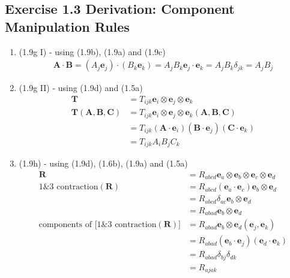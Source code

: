 \documentclass[10pt,a4paper]{book}
\theoremstyle{definition}
\begin{document}
\subsection{Exercise 1.3 Derivation: Component Manipulation Rules}
\begin{enumerate}
\item (1.9g I) - using (1.9b), (1.9a) and (1.9c)
\begin{align}
    \mathbf{A}\cdot\mathbf{B}
    =(A_j\mathbf{e}_j)\cdot(B_k\mathbf{e}_k)
    =A_jB_k\mathbf{e}_j\cdot\mathbf{e}_k
    =A_jB_k\delta_{jk}
    =A_jB_j
\end{align}
\item (1.9g II) - using (1.9d) and (1.5a)
\begin{align}
    \mathbf{T}&=T_{ijk}\mathbf{e}_i\otimes\mathbf{e}_j\otimes\mathbf{e}_k\\
    \mathbf{T}(\mathbf{A},\mathbf{B},\mathbf{C})
    &=T_{ijk}\mathbf{e}_i\otimes\mathbf{e}_j\otimes\mathbf{e}_k(\mathbf{A},\mathbf{B},\mathbf{C})\\
    &=T_{ijk}(\mathbf{A}\cdot\mathbf{e}_i)(\mathbf{B}\cdot\mathbf{e}_j)(\mathbf{C}\cdot\mathbf{e}_k)\\
    &=T_{ijk}A_iB_jC_k
\end{align}
\item (1.9h) - using (1.9d), (1.6b), (1.9a) and (1.5a)
\begin{align}
    \mathbf{R}
    &=R_{abcd}\mathbf{e}_a\otimes\mathbf{e}_b\otimes\mathbf{e}_c\otimes\mathbf{e}_d\\
    \text{1\&3 contraction}(\mathbf{R})
    &=R_{abcd}(\mathbf{e}_a\cdot\mathbf{e}_c) \mathbf{e}_b\otimes\mathbf{e}_d\\
    &=R_{abcd}\delta_{ac} \mathbf{e}_b\otimes\mathbf{e}_d\\
    &=R_{abad}\mathbf{e}_b\otimes\mathbf{e}_d\\
    \text{components of [1\&3 contraction}(\mathbf{R})]&=R_{abad}\mathbf{e}_b\otimes\mathbf{e}_d(\mathbf{e}_j,\mathbf{e}_k)\\
    &=R_{abad}(\mathbf{e}_b\cdot\mathbf{e}_j)(\mathbf{e}_d\cdot\mathbf{e}_k)\\
    &=R_{abad}\delta_{bj}\delta_{dk}\\
    &=R_{ajak}
\end{align}
\end{enumerate}
\end{document}
